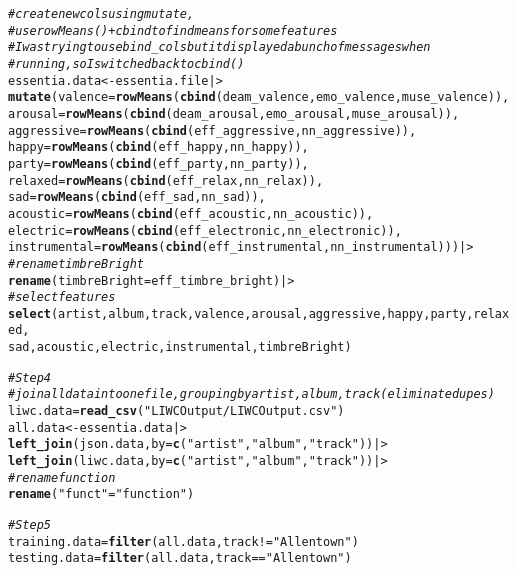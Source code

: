 \documentclass{article}\usepackage[]{graphicx}\usepackage[]{xcolor}
\makeatletter
\newcommand{\hlsng}[1]{\textcolor[rgb]{0.192,0.494,0.8}{#1}}%
\newcommand{\hlcom}[1]{\textcolor[rgb]{0.678,0.584,0.686}{\textit{#1}}}%
\newcommand{\hlopt}[1]{\textcolor[rgb]{0,0,0}{#1}}%
\newcommand{\hldef}[1]{\textcolor[rgb]{0.345,0.345,0.345}{#1}}%
\newcommand{\hlkwb}[1]{\textcolor[rgb]{0.69,0.353,0.396}{#1}}%
\newcommand{\hlkwc}[1]{\textcolor[rgb]{0.333,0.667,0.333}{#1}}%
\newcommand{\hlkwd}[1]{\textcolor[rgb]{0.737,0.353,0.396}{\textbf{#1}}}%
\newenvironment{kframe}{%
 \def\at@end@of@kframe{}%
 \ifinner\ifhmode%
  \def\at@end@of@kframe{\end{minipage}}%
  \begin{minipage}{\columnwidth}%
 \fi\fi%
 \def\FrameCommand##1{\hskip\@totalleftmargin \hskip-\fboxsep
 \colorbox{shadecolor}{##1}\hskip-\fboxsep
     \hskip-\linewidth \hskip-\@totalleftmargin \hskip\columnwidth}%
 \MakeFramed {\advance\hsize-\width
   \@totalleftmargin\z@ \linewidth\hsize
   \@setminipage}}%
 {\par\unskip\endMakeFramed%
 \at@end@of@kframe}
\newenvironment{knitrout}{}{} %
\makeatother
\begin{document}
\begin{enumerate}
\begin{knitrout}
\begin{kframe}
\begin{alltt}
\hlcom{# create new cols using mutate, }
\hlcom{# use rowMeans() + cbind to find means for some features}
\hlcom{# I was trying to use bind_cols but it displayed a bunch of messages when }
\hlcom{# running, so I switched back to cbind()}
\hldef{essentia.data} \hlkwb{<-} \hldef{essentia.file |>}
  \hlkwd{mutate}\hldef{(}\hlkwc{valence} \hldef{=} \hlkwd{rowMeans}\hldef{(}\hlkwd{cbind}\hldef{(deam_valence, emo_valence, muse_valence)),}
         \hlkwc{arousal} \hldef{=} \hlkwd{rowMeans}\hldef{(}\hlkwd{cbind}\hldef{(deam_arousal, emo_arousal, muse_arousal)),}
         \hlkwc{aggressive} \hldef{=} \hlkwd{rowMeans}\hldef{(}\hlkwd{cbind}\hldef{(eff_aggressive, nn_aggressive)),}
         \hlkwc{happy} \hldef{=} \hlkwd{rowMeans}\hldef{(}\hlkwd{cbind}\hldef{(eff_happy, nn_happy)),}
         \hlkwc{party} \hldef{=} \hlkwd{rowMeans}\hldef{(}\hlkwd{cbind}\hldef{(eff_party, nn_party)),}
         \hlkwc{relaxed} \hldef{=} \hlkwd{rowMeans}\hldef{(}\hlkwd{cbind}\hldef{(eff_relax, nn_relax)),}
         \hlkwc{sad} \hldef{=} \hlkwd{rowMeans}\hldef{(}\hlkwd{cbind}\hldef{(eff_sad, nn_sad)),}
         \hlkwc{acoustic} \hldef{=} \hlkwd{rowMeans}\hldef{(}\hlkwd{cbind}\hldef{(eff_acoustic, nn_acoustic)),}
         \hlkwc{electric} \hldef{=} \hlkwd{rowMeans}\hldef{(}\hlkwd{cbind}\hldef{(eff_electronic, nn_electronic)),}
         \hlkwc{instrumental} \hldef{=} \hlkwd{rowMeans}\hldef{(}\hlkwd{cbind}\hldef{(eff_instrumental, nn_instrumental))) |>}
\hlcom{# rename timbreBright}
  \hlkwd{rename}\hldef{(}\hlkwc{timbreBright} \hldef{= eff_timbre_bright) |>}
\hlcom{# select features}
  \hlkwd{select}\hldef{(artist, album, track, valence, arousal, aggressive, happy, party, relaxed,}
         \hldef{sad, acoustic, electric, instrumental, timbreBright)}


\hlcom{# Step 4}
\hlcom{# join all data into one file, grouping by artist, album, track (eliminate dupes)}
\hldef{liwc.data} \hlkwb{=} \hlkwd{read_csv}\hldef{(}\hlsng{"LIWCOutput/LIWCOutput.csv"}\hldef{)}
\hldef{all.data} \hlkwb{<-} \hldef{essentia.data |>}
  \hlkwd{left_join}\hldef{(json.data,} \hlkwc{by} \hldef{=} \hlkwd{c}\hldef{(}\hlsng{"artist"}\hldef{,} \hlsng{"album"}\hldef{,} \hlsng{"track"}\hldef{)) |>}
  \hlkwd{left_join}\hldef{(liwc.data,} \hlkwc{by} \hldef{=} \hlkwd{c}\hldef{(}\hlsng{"artist"}\hldef{,} \hlsng{"album"}\hldef{,} \hlsng{"track"}\hldef{)) |>}
  \hlcom{# rename function}
  \hlkwd{rename}\hldef{(}\hlsng{"funct"} \hldef{=} \hlsng{"function"}\hldef{)}


\hlcom{#Step 5}
\hldef{training.data} \hlkwb{=} \hlkwd{filter}\hldef{(all.data, track} \hlopt{!=} \hlsng{"Allentown"}\hldef{)}
\hldef{testing.data} \hlkwb{=} \hlkwd{filter}\hldef{(all.data, track} \hlopt{==} \hlsng{"Allentown"}\hldef{)}


\end{alltt}
\end{kframe}
\end{knitrout}
\end{enumerate}
\end{document}
